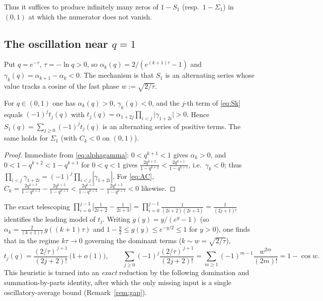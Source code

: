 Thus it suffices to produce infinitely many zeros of $1-S_1$ (resp.\ $1-\Sigma_1$)
in $(0,1)$ at which the numerator does not vanish.

\providecommand{\texorpdfstring}[2]{#1}
\subsection{The oscillation near \texorpdfstring{$q=1$}{q=1}}

Put $q=e^{-\tau}$, $\tau=-\ln q>0$, so $\alpha_k(q)=2/(e^{(k+1)\tau}-1)$ and
$\gamma_k(q)=\alpha_{k+1}-\alpha_k<0$. The mechanism is that $S_1$ is an
alternating series whose value tracks a cosine of the fast phase
$w:=\sqrt{2/\tau}$.

\begin{lemma}\label{lem:signs}
For $q\in(0,1)$ one has $\alpha_k(q)>0$, $\gamma_k(q)<0$, and the $j$-th term of
\eqref{eq:Sk} equals $(-1)^{j}t_j(q)$ with
$t_j(q)=\alpha_{1+2j}\prod_{i<j}\lvert\gamma_{1+2i}\rvert>0$. Hence
$S_1(q)=\sum_{j\ge0}(-1)^{j}t_j(q)$ is an alternating series of positive terms.
The same holds for $\Sigma_1$ \textup(with $C_k<0$ on $(0,1)$\textup).
\end{lemma}

\begin{proof}
Immediate from \eqref{eq:alphagamma}: $0<q^{k+1}<1$ gives $\alpha_k>0$, and
$0<1-q^{k+2}<1-q^{k+1}$ for $0<q<1$ gives
$\tfrac{2q^{k+2}}{1-q^{k+2}}<\tfrac{2q^{k+1}}{1-q^{k+1}}$, i.e.\ $\gamma_k<0$;
thus $\prod_{i<j}\gamma_{1+2i}=(-1)^{j}\prod_{i<j}|\gamma_{1+2i}|$. For
\eqref{eq:AC}, $C_k=\tfrac{2q^{k+3}}{1-q^{k+2}}-\tfrac{2q^{k+2}}{1-q^{k+1}}
<\tfrac{2q^{k+2}}{1-q^{k+2}}-\tfrac{2q^{k+2}}{1-q^{k+1}}<0$ likewise.
\end{proof}

The exact telescoping
$\prod_{i=0}^{j-1}\bigl[\tfrac1{2i+2}-\tfrac1{2i+3}\bigr]
   =\prod_{i=0}^{j-1}\tfrac1{(2i+2)(2i+3)}=\tfrac1{(2j+1)!}$
identifies the leading model of $t_j$. Writing $g(y)=y/(e^{y}-1)$ (so
$\alpha_k=\tfrac{2}{(k+1)\tau}\,g((k+1)\tau)$ and
$1-\tfrac y2\le g(y)\le e^{-y/2}\le1$ for $y>0$), one finds that in the regime
$k\tau\to0$ governing the dominant terms ($k\sim w=\sqrt{2/\tau}$),
\[
  t_j(q)=\frac{(2/\tau)^{\,j+1}}{(2j+2)!}\,\bigl(1+o(1)\bigr),
  \qquad
  \sum_{j\ge0}(-1)^{j}\frac{(2/\tau)^{\,j+1}}{(2j+2)!}
  =\sum_{m\ge1}(-1)^{m-1}\frac{w^{2m}}{(2m)!}=1-\cos w .
\]
This heuristic is turned into an \emph{exact} reduction by the following
domination and summation-by-parts identity, after which the only missing input is
a single oscillatory-average bound (Remark~\ref{rem:gap}).

